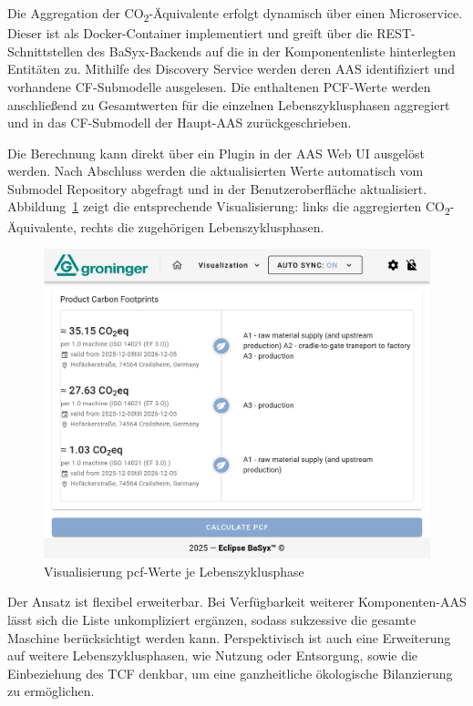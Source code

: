 Die Aggregation der CO\textsubscript{2}-Äquivalente erfolgt dynamisch über einen Microservice. 
Dieser ist als Docker-Container implementiert und greift über die REST-Schnittstellen des BaSyx-Backends auf die in der Komponentenliste hinterlegten Entitäten zu. 
Mithilfe des Discovery Service werden deren AAS identifiziert und vorhandene CF-Submodelle ausgelesen. 
Die enthaltenen PCF-Werte werden anschließend zu Gesamtwerten für die einzelnen Lebenszyklusphasen aggregiert und in das CF-Submodell der Haupt-AAS zurückgeschrieben.

Die Berechnung kann direkt über ein Plugin in der AAS Web UI ausgelöst werden.
Nach Abschluss werden die aktualisierten Werte automatisch vom Submodel Repository abgefragt und in der Benutzeroberfläche aktualisiert. 
\pagebreak
Abbildung~\ref{fig:PluginAggregation} zeigt die entsprechende Visualisierung: links die aggregierten CO\textsubscript{2}-Äquivalente, rechts die zugehörigen 
\linebreak
Lebenszyklusphasen.

\vspace{0.5em}
\begin{figure}[htbp]
    \centering
        \includegraphics[width=1\textwidth]{Bilder/ErgebnisseAASWebUI/CarbonFootprint.png}
    \caption{Visualisierung \acs{pcf}-Werte je Lebenszyklusphase}
    \label{fig:PluginAggregation}
\end{figure}
\vspace{-0.2em}

Der Ansatz ist flexibel erweiterbar.
Bei Verfügbarkeit weiterer Komponenten-AAS lässt sich die Liste unkompliziert ergänzen, sodass sukzessive die gesamte Maschine berücksichtigt werden kann. 
Perspektivisch ist auch eine Erweiterung auf weitere Lebenszyklusphasen, wie Nutzung oder Entsorgung, sowie die Einbeziehung des TCF denkbar, um eine ganzheitliche ökologische Bilanzierung zu ermöglichen.

